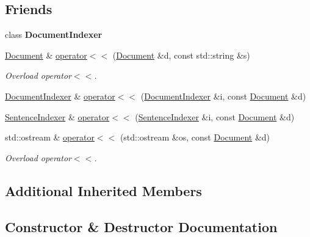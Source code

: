 \subsection*{Friends}
\begin{DoxyCompactItemize}
\item 
\mbox{\label{class_document_a449b7563be6606a689d4417c940b3b39}} 
class {\bfseries Document\+Indexer}
\item 
\hyperlink{class_document}{Document} \& \hyperlink{class_document_ab4b587c28bf3ed83ad2cb6e9052a5a58}{operator$<$$<$} (\hyperlink{class_document}{Document} \&d, const std\+::string \&s)
\begin{DoxyCompactList}\small\item\em Overload operator$<$$<$. \end{DoxyCompactList}\item 
\hyperlink{class_document_indexer}{Document\+Indexer} \& \hyperlink{class_document_a6c2e084b73080867237d1637bc040d66}{operator$<$$<$} (\hyperlink{class_document_indexer}{Document\+Indexer} \&i, const \hyperlink{class_document}{Document} \&d)
\item 
\hyperlink{class_sentence_indexer}{Sentence\+Indexer} \& \hyperlink{class_document_a30be5b0aa936deff7dc8763b554083ef}{operator$<$$<$} (\hyperlink{class_sentence_indexer}{Sentence\+Indexer} \&i, const \hyperlink{class_document}{Document} \&d)
\item 
std\+::ostream \& \hyperlink{class_document_aa87204fbda2f471a4c7a4499d97c8c27}{operator$<$$<$} (std\+::ostream \&os, const \hyperlink{class_document}{Document} \&d)
\begin{DoxyCompactList}\small\item\em Overload operator$<$$<$. \end{DoxyCompactList}\end{DoxyCompactItemize}
\subsection*{Additional Inherited Members}


\subsection{Constructor \& Destructor Documentation}
\mbox{\label{class_document_a4399bbc9420b5e5c269e9d38be5d4810}} 
